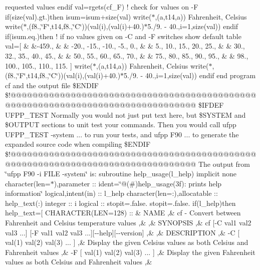 requested values endif val=rgets(\textquotesingle{}cf\+\_\+\+F\textquotesingle{}) ! check for values on -\/\+F if(size(val).\+gt.)then isum=isum+size(val) write($\ast$,\textquotesingle{}(a,t14,a)\textquotesingle{}) \textquotesingle{}\+Fahrenheit\textquotesingle{}, \textquotesingle{}\+Celsius\textquotesingle{} write($\ast$,\textquotesingle{}(f8.,\char`\"{}\+F\char`\"{},t14,f8.,\char`\"{}\+C\char`\"{})\textquotesingle{})(val(i),(val(i)+40.)$\ast$5./9. -\/ 40.,i=1,size(val)) endif if(isum.\+eq.)then ! if no values given on -\/\+C and -\/\+F switches show default table val=\mbox{[} \& \&-\/459., \& \& -\/20., -\/15., -\/10., -\/5., 0., \& \& 5., 10., 15., 20., 25., \& \& 30., 32., 35., 40., 45., \& \& 50., 55., 60., 65., 70., \& \& 75., 80., 85., 90., 95., \& \& 98., 100., 105., 110., 115. \mbox{]} write($\ast$,\textquotesingle{}(a,t14,a)\textquotesingle{}) \textquotesingle{}\+Fahrenheit\textquotesingle{}, \textquotesingle{}\+Celsius\textquotesingle{} write($\ast$,\textquotesingle{}(f8.,\char`\"{}\+F\char`\"{},t14,f8.,\char`\"{}\+C\char`\"{})\textquotesingle{})(val(i),(val(i)+40.)$\ast$5./9. -\/ 40.,i=1,size(val)) endif end program cf and the output file \$\+E\+N\+D\+I\+F \$!@@@@@@@@@@@@@@@@@@@@@@@@@@@@@@@@@@@@@@@@@@@@@@@@@@@@@@@@@@@@@@@@@@@@@@@@@@@@@@@@ \$\+I\+F\+D\+E\+F U\+F\+P\+P\+\_\+\+T\+E\+S\+T Normally you would not just put text here, but \$\+S\+Y\+S\+T\+E\+M and \$\+O\+U\+T\+P\+U\+T sections to unit test your commands. Then you would call ufpp U\+F\+P\+P\+\_\+\+T\+E\+S\+T -\/system ... to run your tests, and ufpp F90 ... to generate the expanded source code when compiling \$\+E\+N\+D\+I\+F \$!@@@@@@@@@@@@@@@@@@@@@@@@@@@@@@@@@@@@@@@@@@@@@@@@@@@@@@@@@@@@@@@@@@@@@@@@@@@@@@@@ The output from \char`\"{}ufpp F90 -\/i F\+I\+L\+E -\/system\char`\"{} is\+: subroutine help\+\_\+usage(l\+\_\+help) implicit none character(len=$\ast$),parameter \+:: ident=\char`\"{}@(\#)help\+\_\+usage(3f)\+: prints help information\char`\"{} logical,intent(in) \+:: l\+\_\+help character(len=\+:),allocatable \+:: help\+\_\+text(\+:) integer \+:: i logical \+:: stopit=.\+false. stopit=.\+false. if(l\+\_\+help)then help\+\_\+text=\mbox{[} C\+H\+A\+R\+A\+C\+T\+E\+R(\+L\+E\+N=128) \+:: \& \textquotesingle{}\+N\+A\+M\+E \textquotesingle{},\& \textquotesingle{} cf -\/ Convert between Fahrenheit and Celsius temperature values \textquotesingle{},\& \textquotesingle{} \textquotesingle{},\& \textquotesingle{}\+S\+Y\+N\+O\+P\+S\+I\+S \textquotesingle{},\& \textquotesingle{} cf \mbox{[}-\/\+C val1 val2 val3 ...\mbox{]} \mbox{[}-\/\+F val1 val2 val3 ...\mbox{]}\mbox{[}-\/-\/help\mbox{]}\mbox{[}-\/-\/version\mbox{]} \textquotesingle{},\& \textquotesingle{} \textquotesingle{},\& \textquotesingle{}\+D\+E\+S\+C\+R\+I\+P\+T\+I\+O\+N \textquotesingle{},\& \textquotesingle{} -\/\+C \mbox{[} val(1) val(2) val(3) ... \mbox{]} \textquotesingle{},\& \textquotesingle{} Display the given Celsius values as both Celsius and Fahrenheit values \textquotesingle{},\& \textquotesingle{} -\/\+F \mbox{[} val(1) val(2) val(3) ... \mbox{]} \textquotesingle{},\& \textquotesingle{} Display the given Fahrenheit values as both Celsius and Fahrenheit values \textquotesingle{},\& \textquotesingle{} 